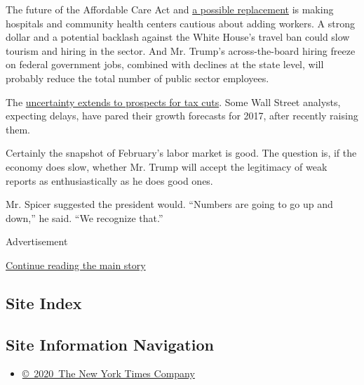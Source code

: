 The future of the Affordable Care Act and
\href{https://www.nytimes.com/2017/03/07/upshot/why-even-some-republicans-are-rejecting-the-replacement-bill.html}{a
possible replacement} is making hospitals and community health centers
cautious about adding workers. A strong dollar and a potential backlash
against the White House's travel ban could slow tourism and hiring in
the sector. And Mr. Trump's across-the-board hiring freeze on federal
government jobs, combined with declines at the state level, will
probably reduce the total number of public sector employees.

The
\href{https://www.nytimes.com/2017/02/16/business/yourtaxes/tax-code-republicans.html}{uncertainty
extends to prospects for tax cuts}. Some Wall Street analysts, expecting
delays, have pared their growth forecasts for 2017, after recently
raising them.

Certainly the snapshot of February's labor market is good. The question
is, if the economy does slow, whether Mr. Trump will accept the
legitimacy of weak reports as enthusiastically as he does good ones.

Mr. Spicer suggested the president would. ``Numbers are going to go up
and down,'' he said. ``We recognize that.''

Advertisement

\protect\hyperlink{after-bottom}{Continue reading the main story}

\hypertarget{site-index}{%
\subsection{Site Index}\label{site-index}}

\hypertarget{site-information-navigation}{%
\subsection{Site Information
Navigation}\label{site-information-navigation}}

\begin{itemize}
\tightlist
\item
  \href{https://help.nytimes.com/hc/en-us/articles/115014792127-Copyright-notice}{©~2020~The
  New York Times Company}
\end{itemize}

